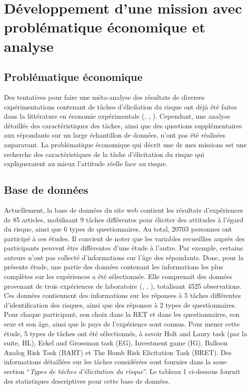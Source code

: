\documentclass[12pt]{article}
\begin{document}
\section{Développement d’une mission avec problématique économique et analyse}
\label{sec:fourth}

\subsection{Problématique économique}

Des tentatives pour faire une méta-analyse des résultats de diverses
expérimentations contenant de tâches d'élicilation du risque ont déjà
été faites dans la littérature en économie expérimentale
(\citet{CroFil2013b}, \citet{Alserda2019}, \citet{Bokern2021}).
Cependant, une analyse détaillée des caractéristiques des tâches, ainsi
que des questions supplémentaires aux répondants sur un large
échantillon de données, n'ont pas été réalisées auparavant. La
problématique économique qui décrit une de mes missions est une
recherche des caractéristiques de la tâche d'élicitation du risque qui
expliqueraient au mieux l'attitude réelle face au risque.

\subsection{Base de données}

Actuellement, la base de données du site web contient les résultats
d'expériences de 85 articles, mobilisant 9 tâches différentes pour
éliciter des attitudes à l'égard du risque, ainsi que 6 types de
questionnaires. Au total, 20703 personnes ont participé à ces études. Il
convient de noter que les variables recueillies auprès des participants
peuvent être diffèrentes d'une étude à l'autre. Par exemple, certains
auteurs n'ont pas collecté d'informations sur l'âge des répondants.
Donc, pour la présente étude, une partie des données contenant les
informations les plus complètes sur les expériences a été sélectionnée.
Elle comprenait des données provenant de trois expériences de
laboratoire (\citet{Crosetto2013}, \citet{Crosetto2016},
\citet{Frey2017}), totalisant 4525 observations. Ces données contiennent
des informations sur les réponses à 5 tâches différentes
d'identification des risques, ainsi que des réponses à 2 types de
questionnaires. Pour chaque participant, son choix dans la RET et dans
les questionnaires, son sexe et son âge, ainsi que le pays de
l'expérience sont connus. Pour mener cette étude, 5 types de tâches ont
été sélectionnés, à savoir Holt and Laury task (par la suite, HL), Eckel
and Grossman task (EG), Investment game (IG), Balloon Analog Risk Task
(BART) et The Bomb Risk Elicitation Task (BRET). Des informations
détaillées sur les tâches considérées sont fournies dans la sous-section
``\emph{Types de tâches d'élicitation du risque}''. Le tableau 1
ci-dessous fournit des statistiques descriptives pour cette base de
données.
\end{document}
